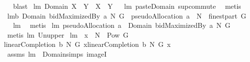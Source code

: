 \begin{isabellebody}
\isadelimproof
\ %
\endisadelimproof
%
\isatagproof
{}\isamarkupfalse%
\ blast%
\endisatagproof
{\isafoldproof}%
%
\isadelimproof
%
\endisadelimproof
\isanewline
{}\isamarkupfalse%
\ lm{}{}{\isacharcolon}\ {\isachardoublequoteopen}Domain\ {\isacharparenleft}X\ {\isacharless}{\isacharbar}{\isacharbar}\ Y{\isacharparenright}\ {\isacharequal}\ X\ {\isasymunion}\ Y{\isachardoublequoteclose}%
\isadelimproof
\ %
\endisadelimproof
%
\isatagproof
{}\isamarkupfalse%
\ lm{}{}\ paste{\isacharunderscore}Domain\ sup{\isacharunderscore}commute\ \isamarkupfalse%
\ metis%
\endisatagproof
{\isafoldproof}%
%
\isadelimproof
%
\endisadelimproof
\isanewline
{}\isamarkupfalse%
\ lm{}{}b{\isacharcolon}\ {\isachardoublequoteopen}Domain\ {\isacharparenleft}bidMaximizedBy\ a\ N\ G{\isacharparenright}\ {\isacharequal}\ pseudoAllocation\ a\ {\isasymunion}\ N\ {\isasymtimes}\ {\isacharparenleft}finestpart\ G{\isacharparenright}{\isachardoublequoteclose}%
\isadelimproof
\ %
\endisadelimproof
%
\isatagproof
{}\isamarkupfalse%
\ lm{}{}\ \isanewline
{}\isamarkupfalse%
\ metis%
\endisatagproof
{\isafoldproof}%
%
\isadelimproof
%
\endisadelimproof
\isanewline
{}\isamarkupfalse%
\ lm{}{}{\isacharcolon}\ {\isachardoublequoteopen}{\isacharparenleft}pseudoAllocation\ a{\isacharparenright}\ {\isasymsubseteq}\ Domain\ {\isacharparenleft}bidMaximizedBy\ a\ N\ G{\isacharparenright}{\isachardoublequoteclose}%
\isadelimproof
\ %
\endisadelimproof
%
\isatagproof
{}\isamarkupfalse%
\ {\isacharparenleft}metis\ lm{}{}\ Un{\isacharunderscore}upper{}{\isacharparenright}%
\endisatagproof
{\isafoldproof}%
%
\isadelimproof
%
\endisadelimproof
\isanewline
\isanewline
{}\isamarkupfalse%
\ lm{}{}{\isacharcolon}\ \ {\isachardoublequoteopen}x\ {\isasymin}\ {\isacharparenleft}N\ {\isasymtimes}\ {\isacharparenleft}Pow\ G\ {\isacharminus}\ {\isacharbraceleft}{\isacharbraceleft}{\isacharbraceright}{\isacharbraceright}{\isacharparenright}{\isacharparenright}{\isachardoublequoteclose}\ \ \isanewline
{\isachardoublequoteopen}linearCompletion{\isacharprime}\ b\ N\ G\ x{\isacharequal}linearCompletion\ b\ N\ G\ x{\isachardoublequoteclose}\isanewline
%
\isadelimproof
%
\endisadelimproof
%
\isatagproof
{}\isamarkupfalse%
\ assms\ lm{}{}\ \ Domain{\isachardot}simps\ imageI\ \isamarkupfalse%

\end{isabellebody}
